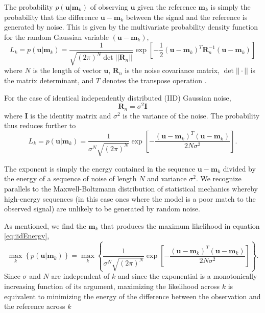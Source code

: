 The probability $p(\mathbf{u}|\mathbf{m}_k)$ of observing $\mathbf{u}$ given the reference $\mathbf{m}_k$ is simply the probability that the difference $\mathbf{u}-\mathbf{m}_k$ between the signal and the reference is generated by noise. This is given by the multivariate probability density function for the random Gaussian variable $(\mathbf{u}-\mathbf{m}_k)$, 
\begin{equation}\label{eq:Main}
L_k = p(\mathbf{u}|\mathbf{m}_k) = \frac{1}{  \sqrt{ (2\pi)^N \det || \mathbf{R}_n||} } \exp\left[ -\frac{1}{2}  (\mathbf{u}-\mathbf{m}_k)^T \mathbf{R}_n^{-1} (\mathbf{u}-\mathbf{m}_k) \right]
\end{equation}
where $N$ is the length of vector $\mathbf{u}$, $\mathbf{R}_n$ is the noise covariance matrix, $\det||{\cdot}||$ is the matrix determinant, and $T$ denotes the transpose operation  \citep{helstrom_statistical_1968, wainstein_extraction_1962}.

For the case of identical independently distributed (IID) Gaussian noise, 
\begin{equation}
\mathbf{R}_n=\sigma^2 \mathbf{I}
\end{equation}
where $\mathbf{I}$ is the identity matrix and $\sigma^2$ is the variance of the noise. The probability thus reduces further to
\begin{equation}\label{eq:iidEnergy}
L_k = p(\mathbf{u}|\mathbf{m}_k) = \frac{1}{  \sigma^N \sqrt{ (2\pi)^N}   } \exp\left[ -\frac{(\mathbf{u}-\mathbf{m}_k)^T(\mathbf{u}-\mathbf{m}_k)} {2 N \sigma^2 } \right].
\end{equation}

The exponent is simply the energy contained in the sequence $\mathbf{u}-\mathbf{m}_k$ divided by the
energy of a sequence of noise of length $N$ and variance $\sigma^2$. We recognize parallels to the Maxwell-Boltzmann distribution of statistical mechanics \citep{reif_fundamentals_1965} whereby high-energy sequences (in this case ones where the model is a poor match to the observed signal) are unlikely to be generated by random noise.  

As mentioned, we find the $\mathbf{m}_k$ that produces the maximum likelihood in equation \ref{eq:iidEnergy},
\begin{equation}
\max_k   \left\{ p(\mathbf{u}|\mathbf{m}_k) \right\} =  \max_k  \left\{ \frac{1}{   \sigma^N\sqrt{ (2\pi)^N}  } \exp\left[ -\frac{(\mathbf{u}-\mathbf{m}_k)^T(\mathbf{u}-\mathbf{m}_k)} {2 N \sigma^2 } \right] \right\}. 
\end{equation}
Since $\sigma$ and $N$ are independent of $k$ and since the exponential is a monotonically increasing function of its argument, maximizing the likelihood across $k$ is equivalent to minimizing the energy of the difference between the observation and the reference across $k$ 


